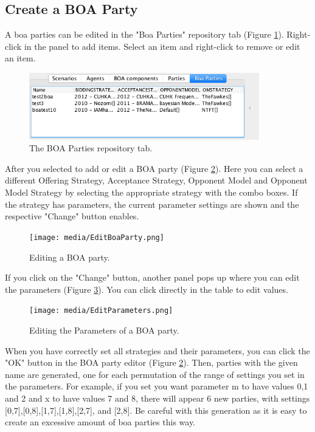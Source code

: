 \documentclass[]{article}
\begin{document}
\FloatBarrier

\subsection{Create a BOA Party}
A boa parties can be edited in the "Boa Parties" repository tab (Figure \ref{fig:boaparties}). Right-click in the panel to add items. Select an item and right-click to remove or edit an item.   


\begin{figure}[!ht] 
	\center
	\includegraphics[width=10.0cm]{media/boacomponants.png}
	\caption{The BOA Parties repository tab.}
	\label{fig:boaparties}
\end{figure}


After you selected to add or edit a BOA party (Figure \ref{fig:editboaparty}).  Here you can select a different Offering Strategy, Acceptance Strategy, Opponent Model and Opponent Model Strategy by selecting the appropriate strategy with the combo boxes. If the strategy has parameters, the current parameter settings are shown and the respective "Change" button enables.


\begin{figure}[!ht] 
	\center
	\texttt{[image: media/EditBoaParty.png]}
	\caption{Editing a BOA party.}
	\label{fig:editboaparty}
\end{figure}

If you click on the  "Change" button, another panel pops up where you can edit the parameters (Figure \ref{fig:editparameters}). You can click directly in the table to edit values.

\begin{figure}[!ht] 
	\center
	\texttt{[image: media/EditParameters.png]}
	\caption{Editing the Parameters of a BOA party.}
	\label{fig:editparameters}
\end{figure}

When you have correctly set all strategies and their parameters, you can click the "OK" button in the BOA party editor (Figure  \ref{fig:editboaparty}). Then, parties with the given name are generated, one for each permutation of the range of settings you set in the parameters. For example, if you set you want parameter m to have values 0,1 and 2 and x to have values 7 and 8, there will appear 6 new parties, with settings [0,7],[0,8],[1,7],[1,8],[2,7], and [2,8]. Be careful with this generation as it is easy to create an excessive amount of boa parties this way.
\end{document}
